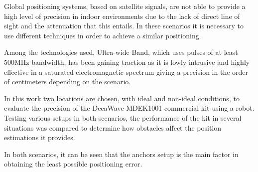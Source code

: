 Global positioning systems, based on satellite signals, are not able to provide a high level of precision in indoor environments due to the lack of direct line of sight and the attenuation that this entails.
In these scenarios it is necessary to use different techniques in order to achieve a similar positioning.

Among the technologies used, Ultra-wide Band, which uses pulses of at least 500MHz bandwidth, has been gaining traction as it is lowly intrusive and highly effective in a saturated electromagnetic spectrum giving a precision in the order of centimeters depending on the scenario.

In this work two locations are chosen, with ideal and non-ideal conditions, to evaluate the precision of the DecaWave MDEK1001 commercial kit using a robot.
Testing various setups in both scenarios, the performance of the kit in several situations was compared to determine how obstacles affect the position estimations it provides.

In both scenarios, it can be seen that the anchors setup is the main factor in obtaining the least possible positioning error.
